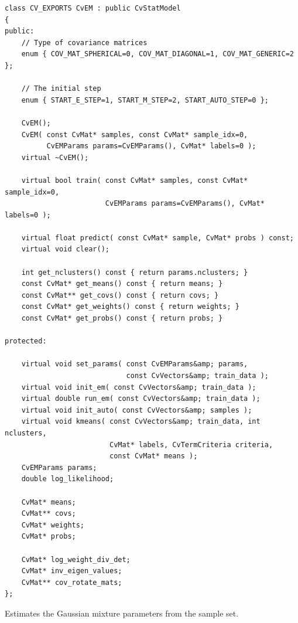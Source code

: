 \begin{lstlisting}
class CV_EXPORTS CvEM : public CvStatModel
{
public:
    // Type of covariance matrices
    enum { COV_MAT_SPHERICAL=0, COV_MAT_DIAGONAL=1, COV_MAT_GENERIC=2 };

    // The initial step
    enum { START_E_STEP=1, START_M_STEP=2, START_AUTO_STEP=0 };

    CvEM();
    CvEM( const CvMat* samples, const CvMat* sample_idx=0,
          CvEMParams params=CvEMParams(), CvMat* labels=0 );
    virtual ~CvEM();

    virtual bool train( const CvMat* samples, const CvMat* sample_idx=0,
                        CvEMParams params=CvEMParams(), CvMat* labels=0 );

    virtual float predict( const CvMat* sample, CvMat* probs ) const;
    virtual void clear();

    int get_nclusters() const { return params.nclusters; }
    const CvMat* get_means() const { return means; }
    const CvMat** get_covs() const { return covs; }
    const CvMat* get_weights() const { return weights; }
    const CvMat* get_probs() const { return probs; }

protected:

    virtual void set_params( const CvEMParams&amp; params,
                             const CvVectors&amp; train_data );
    virtual void init_em( const CvVectors&amp; train_data );
    virtual double run_em( const CvVectors&amp; train_data );
    virtual void init_auto( const CvVectors&amp; samples );
    virtual void kmeans( const CvVectors&amp; train_data, int nclusters,
                         CvMat* labels, CvTermCriteria criteria,
                         const CvMat* means );
    CvEMParams params;
    double log_likelihood;

    CvMat* means;
    CvMat** covs;
    CvMat* weights;
    CvMat* probs;

    CvMat* log_weight_div_det;
    CvMat* inv_eigen_values;
    CvMat** cov_rotate_mats;
};
\end{lstlisting}



Estimates the Gaussian mixture parameters from the sample set.


